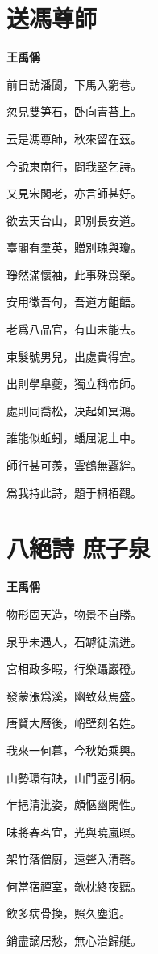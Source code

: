 \documentclass[12pt,a4paper]{ctexbook}
\begin{document}
\section{送馮尊師}
\textbf{王禹偁}\par\vspace{0.5em}
前日訪潘閬，下馬入窮巷。\par
忽見雙笋石，卧向青苔上。\par
云是馮尊師，秋來留在茲。\par
今說東南行，問我堅乞詩。\par
又見宋閣老，亦言師甚好。\par
欲去天台山，即別長安道。\par
臺閣有羣英，贈別瑰與瓊。\par
琤然滿懷袖，此事殊爲榮。\par
安用徵吾句，吾道方齟齬。\par
老爲八品官，有山未能去。\par
束髮號男兒，出處貴得宜。\par
出則學臯夔，獨立稱帝師。\par
處則同喬松，决起如冥鴻。\par
誰能似蚯蚓，蟠屈泥土中。\par
師行甚可羨，雲鶴無覊絆。\par
爲我持此詩，題于桐栢觀。\par

\section{八絕詩 庶子泉}
\textbf{王禹偁}\par\vspace{0.5em}
物形固天造，物景不自勝。\par
泉乎未遇人，石罅徒流迸。\par
宮相政多暇，行樂躡巖磴。\par
發蒙漲爲溪，幽致茲焉盛。\par
唐賢大曆後，峭壁刻名姓。\par
我來一何暮，今秋始乘興。\par
山勢環有缺，山門壺引柄。\par
乍挹清泚姿，頗愜幽閑性。\par
味將春茗宜，光與曉嵐暝。\par
架竹落僧厨，遠聲入清磬。\par
何當宿禪室，欹枕終夜聽。\par
飲多病骨換，照久塵逈。\par
銷盡謫居愁，無心治歸艇。\par
\end{document}
